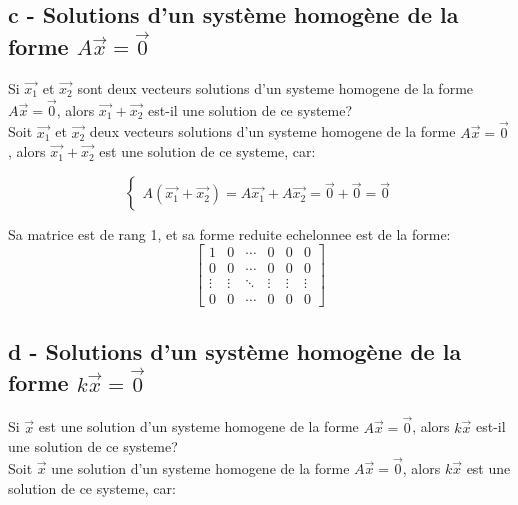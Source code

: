\documentclass{config/homework}
\begin{document}
    \noindent{}
    \newpage


    \subsection{c - Solutions d'un système homogène de la forme $A\vec{x} = \vec{0}$}\label{subsec:c}
    Si $\vec{x_1}$ et $\vec{x_2}$ sont deux vecteurs solutions d'un systeme homogene de la forme
    $A\vec{x} = \vec{0}$,
    alors $\vec{x_1} + \vec{x_2}$ est-il une solution de ce systeme?\\

    Soit $\vec{x_1}$ et $\vec{x_2}$ deux vecteurs solutions d'un systeme homogene de la forme
    $A\vec{x} = \vec{0}$, alors $\vec{x_1} + \vec{x_2}$ est une solution de ce systeme, car:

    \[
        \begin{cases}
            A(\vec{x_1} + \vec{x_2}) = A\vec{x_1} + A\vec{x_2} = \vec{0} + \vec{0} = \vec{0}
        \end{cases}
    \]

    Sa matrice est de rang 1, et sa forme reduite echelonnee est de la forme:
    \[
        \left[
            \begin{array}{rrrrr|r}
                1 & 0 & \cdots & 0 & 0 & 0 \\
                0 & 0 & \cdots & 0 & 0 & 0 \\
                \vdots & \vdots & \ddots & \vdots & \vdots & \vdots \\
                0 & 0 & \cdots & 0 & 0 & 0
            \end{array}
        \right]
    \]

    \noindent{}

    \newpage

    \subsection{d - Solutions d'un système homogène de la forme $k\vec{x} = \vec{0}$}\label{subsec:d}
    Si $\vec{x}$ est une solution d'un systeme homogene de la forme $A\vec{x} = \vec{0}$, alors $k\vec{x}$
    est-il une solution de ce systeme?\\

    Soit $\vec{x}$ une solution d'un systeme homogene de la forme $A\vec{x} = \vec{0}$, alors $k\vec{x}$
    est une solution de ce systeme, car:
\end{document}
